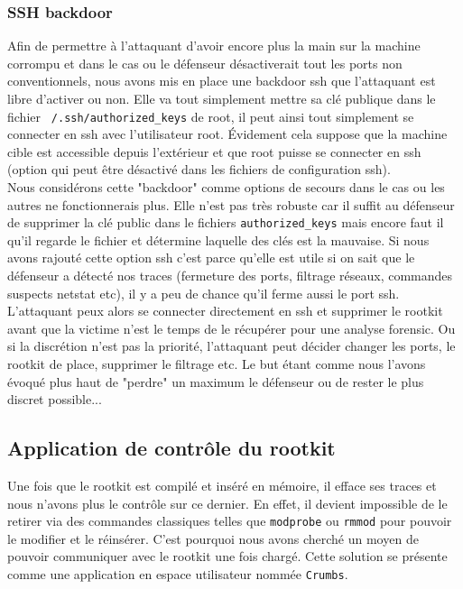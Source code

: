 \documentclass[12pt]{article}
\begin{document}
            
        \subsubsection{SSH backdoor}
        
            Afin de permettre à l'attaquant d'avoir encore plus la main sur la machine corrompu et dans le cas ou le défenseur désactiverait tout les ports non conventionnels, nous avons mis en place une backdoor ssh que l'attaquant est libre d'activer ou non. Elle va tout simplement mettre sa clé publique  dans le fichier \texttt{~/.ssh/authorized\_keys} de root, il peut ainsi tout simplement se connecter en ssh avec l'utilisateur root. Évidement cela suppose que la machine cible est accessible depuis l'extérieur et que root puisse se connecter en ssh (option qui peut être désactivé dans les fichiers de configuration ssh). \\
            
            Nous considérons cette "backdoor" comme options de secours dans le cas ou les autres ne fonctionnerais plus. Elle n'est pas très robuste car il suffit au défenseur de supprimer la clé public  dans le fichiers \texttt{authorized\_keys} mais encore faut il qu'il regarde le fichier et détermine laquelle des clés est la mauvaise. 
            Si nous avons rajouté cette option ssh c'est parce qu'elle est utile si on sait que le défenseur a détecté nos traces (fermeture des ports, filtrage réseaux, commandes  suspects netstat etc), il y a peu de chance qu'il ferme aussi le port ssh. L'attaquant peux alors se connecter directement en ssh et supprimer le rootkit avant que la victime n'est le temps de le récupérer pour une analyse forensic. Ou si la discrétion n'est pas la priorité, l'attaquant peut décider changer les ports, le rootkit de place, supprimer le filtrage  etc. Le but étant comme nous l'avons évoqué plus haut de "perdre" un maximum le défenseur ou de rester le plus discret possible... 
            
            
    \subsection{Application de contrôle du rootkit}
    \label{sec:crumb}

        Une fois que le rootkit est compilé et inséré en mémoire, il efface ses traces et nous n'avons plus le contrôle sur ce dernier. En effet, il devient impossible de le retirer via des commandes classiques telles que \texttt{modprobe} ou \texttt{rmmod} pour pouvoir le modifier et le réinsérer. C'est pourquoi nous avons cherché un moyen de pouvoir communiquer avec le rootkit une fois chargé. Cette solution se présente comme une application en espace utilisateur nommée \texttt{Crumbs}. \\
\end{document}
